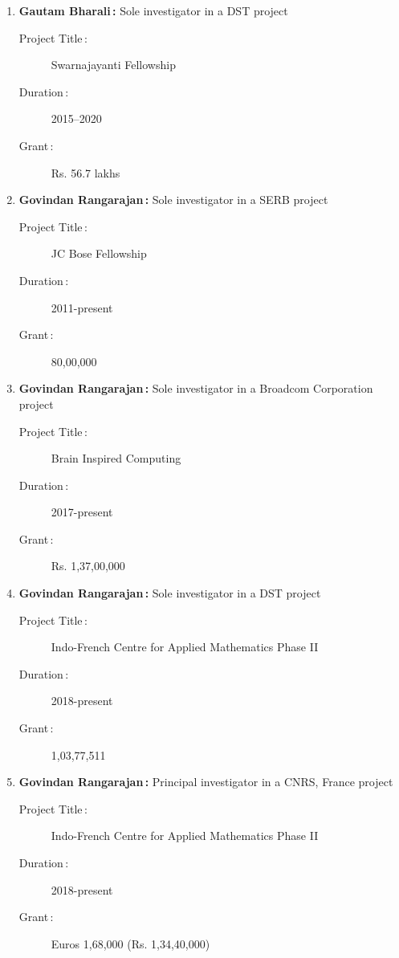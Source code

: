 \begin{enumerate}
\item {\bf Gautam Bharali\,:} Sole investigator in a DST project
\begin{description}
  \item[Project Title\,:] Swarnajayanti Fellowship
  \item[Duration\,:] 2015--2020
  \item[Grant\,:] Rs. 56.7 lakhs
\end{description}


\item {\bf Govindan Rangarajan\,:} Sole investigator in a SERB project
\begin{description}
  \item[Project Title\,:] JC Bose Fellowship
  \item[Duration\,:] 2011-present
  \item[Grant\,:] 80,00,000
\end{description}


\item {\bf Govindan Rangarajan\,:} Sole investigator in a Broadcom Corporation project
\begin{description}
  \item[Project Title\,:] Brain Inspired Computing
  \item[Duration\,:] 2017-present
  \item[Grant\,:] Rs. 1,37,00,000
\end{description}


\item {\bf Govindan Rangarajan\,:} Sole investigator in a DST project
\begin{description}
  \item[Project Title\,:] Indo-French Centre for Applied Mathematics Phase II
  \item[Duration\,:] 2018-present
  \item[Grant\,:] 1,03,77,511
\end{description}


\item {\bf Govindan Rangarajan\,:} Principal investigator in a CNRS, France project
\begin{description}
  \item[Project Title\,:] Indo-French Centre for Applied Mathematics Phase II
  \item[Duration\,:] 2018-present
  \item[Grant\,:] Euros 1,68,000 (Rs. 1,34,40,000)
\end{description}



\end{enumerate}
